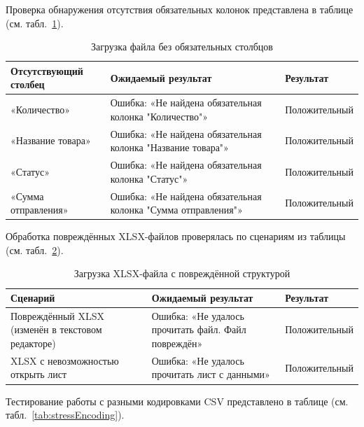 Проверка обнаружения отсутствия обязательных колонок представлена в таблице (см. табл.~\ref{tab:stressMissingColumns}).

\begin{table}[!htb]
\caption{\label{tab:stressMissingColumns}Загрузка файла без обязательных столбцов}
\small
\begin{center}
\vspace{-0.5cm}\begin{tabular}{|p{4cm}|p{8cm}|p{3cm}|}
\hline
Отсутствующий столбец & Ожидаемый результат & Результат \\ \hline
«Количество» & Ошибка: «Не найдена обязательная колонка "Количество"» & Положительный \\ \hline
«Название товара» & Ошибка: «Не найдена обязательная колонка "Название товара"» & Положительный \\ \hline
«Статус» & Ошибка: «Не найдена обязательная колонка "Статус"» & Положительный \\ \hline
«Сумма отправления» & Ошибка: «Не найдена обязательная колонка "Сумма отправления"» & Положительный \\ \hline
\end{tabular}
\end{center}
\end{table}

Обработка повреждённых XLSX-файлов проверялась по сценариям из таблицы (см. табл.~\ref{tab:stressCorruptedXlsx}).

\begin{table}[!htb]
\caption{\label{tab:stressCorruptedXlsx}Загрузка XLSX-файла с повреждённой структурой}
\small
\begin{center}
\vspace{-0.5cm}\begin{tabular}{|p{4cm}|p{8cm}|p{3cm}|}
\hline
Сценарий & Ожидаемый результат & Результат \\ \hline
Повреждённый XLSX (изменён в текстовом редакторе) & Ошибка: «Не удалось прочитать файл. Файл повреждён» & Положительный \\ \hline
XLSX с невозможностью открыть лист & Ошибка: «Не удалось прочитать лист с данными» & Положительный \\ \hline
\end{tabular}
\end{center}
\end{table}

Тестирование работы с разными кодировками CSV представлено в таблице (см. табл.~\ref{tab:stressEncoding}).

